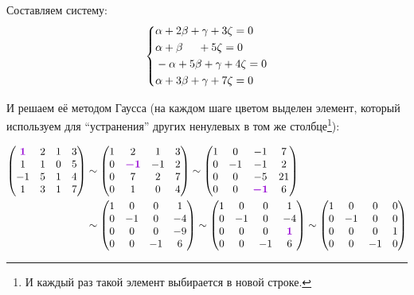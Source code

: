 \documentclass[a4paper,12pt]{article}
\begin{document}
  Составляем систему:
  \[
    \left\{
      \begin{aligned}
        &\alpha + 2\beta + \gamma + 3\zeta = 0\\
        &\alpha + \beta \hphantom{+ \gamma} + 5\zeta = 0\\
        &-\alpha + 5\beta + \gamma + 4\zeta = 0\\
        &\alpha + 3\beta + \gamma + 7\zeta = 0
      \end{aligned}
    \right.
  \]
  
  И решаем её методом Гаусса (на каждом шаге цветом выделен элемент, который используем для ``устранения'' других ненулевых в том же столбце\footnote{И каждый раз такой элемент выбирается в новой строке.}):
  
  \begin{equation}\label{p-20-18-independence}
  \begin{split}
    \begin{pmatrix}
      \textcolor{violet}{\bds 1} & 2 & 1 & 3\\
      1 & 1 & 0 & 5\\
      -1 & 5 & 1 & 4\\
      1 & 3 & 1 & 7
    \end{pmatrix}
    &\sim \begin{pmatrix}
      1 & 2 & 1 & 3\\
      0 & \textcolor{violet}{\bds{-1}} & -1 & 2\\
      0 & 7 & 2 & 7\\
      0 & 1 & 0 & 4
    \end{pmatrix}
    \sim \begin{pmatrix}
      1 & 0 & -1 & 7\\
      0 & -1 & -1 & 2\\
      0 & 0 & -5 & 21\\
      0 & 0 & \textcolor{violet}{\bds{-1}} & 6
    \end{pmatrix}\\
    &\sim \begin{pmatrix}
      1 & 0 & 0 & 1\\
      0 & -1 & 0 & -4\\
      0 & 0 & 0 & -9\\
      0 & 0 & -1 & 6
    \end{pmatrix}
    \sim \begin{pmatrix}
      1 & 0 & 0 & 1\\
      0 & -1 & 0 & -4\\
      0 & 0 & 0 & \textcolor{violet}{\bds 1}\\
      0 & 0 & -1 & 6
    \end{pmatrix}
    \sim \begin{pmatrix}
      1 & 0 & 0 & 0\\
      0 & -1 & 0 & 0\\
      0 & 0 & 0 & 1\\
      0 & 0 & -1 & 0
    \end{pmatrix}
  \end{split}
  \end{equation}
  
\end{document}
